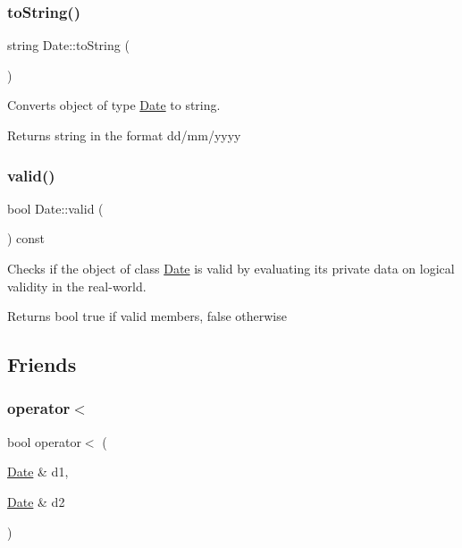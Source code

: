 \subsubsection{\texorpdfstring{to\+String()}{toString()}}
{\footnotesize\ttfamily string Date\+::to\+String (\begin{DoxyParamCaption}{ }\end{DoxyParamCaption})}



Converts object of type \hyperlink{class_date}{Date} to string. 

\begin{DoxyReturn}{Returns}
string in the format dd/mm/yyyy 
\end{DoxyReturn}
\mbox{\label{group___date_gac7a8c7b77f99b162a931199464c1bedc}} 
\subsubsection{\texorpdfstring{valid()}{valid()}}
{\footnotesize\ttfamily bool Date\+::valid (\begin{DoxyParamCaption}{ }\end{DoxyParamCaption}) const}



Checks if the object of class \hyperlink{class_date}{Date} is valid by evaluating it\textquotesingle{}s private data on logical validity in the real-\/world. 

\begin{DoxyReturn}{Returns}
bool true if valid members, false otherwise 
\end{DoxyReturn}


\subsection{Friends}
\mbox{\label{group___date_ga532ae38442ee586783b532725767634a}} 
\subsubsection{\texorpdfstring{operator$<$}{operator<}}
{\footnotesize\ttfamily bool operator$<$ (\begin{DoxyParamCaption}\item[{\hyperlink{class_date}{Date} \&}]{d1,  }\item[{\hyperlink{class_date}{Date} \&}]{d2 }\end{DoxyParamCaption})\hspace{0.3cm}{\ttfamily [friend]}}



